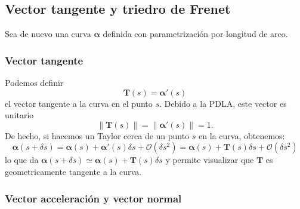\documentclass[11pt]{book}
\theoremstyle{definicion}
\theoremstyle{teorema}
\theoremstyle{ejemplo}
\newtheorem{example}{Ejemplo}
\begin{document}

%
%




%

\subsection{Vector tangente y triedro de Frenet}

\noindent
Sea de nuevo una curva $\boldsymbol{\alpha}$
definida con parametrización por longitud de arco.

\subsubsection{Vector tangente}

\noindent
Podemos definir 
$$\mathbf{T}(s) = \boldsymbol{\alpha}'(s)$$el vector tangente 
a la curva en el punto $s$. 
Debido a la PDLA,
este vector es unitario
\[
\| \mathbf{T}(s) \|
=
\| \boldsymbol{\alpha}'(s) \|
=1.
\]
De hecho, si hacemos un Taylor cerca de un punto $s$ en la curva, obtenemos:
\[
\boldsymbol{\alpha} (s+\delta s) =
\boldsymbol{\alpha} (s)
+ \boldsymbol{\alpha}'(s) \delta s
+ \mathcal{O}(\delta s^2)
= 
\boldsymbol{\alpha} (s)
+ \mathbf{T}(s) \delta s
+ \mathcal{O}(\delta s^2)
\]
lo que da $\boldsymbol{\alpha} (s+\delta s) \simeq \boldsymbol{\alpha} (s)
+ \mathbf{T}(s) \delta s$ y permite visualizar que $\mathbf{T}$ es geometricamente tangente a la curva.

\subsubsection{Vector acceleración y vector normal}
\end{document}
